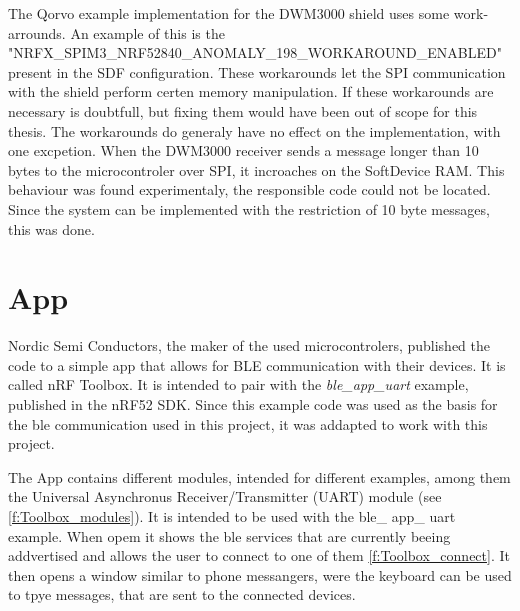 The Qorvo example implementation for the DWM3000 shield uses some work-arrounds. An example of this is the "NRFX{\_}SPIM3{\_}NRF52840{\_}ANOMALY{\_}198{\_}WORKAROUND{\_}ENABLED" present in the SDF configuration. These workarounds let the SPI communication with the shield perform certen memory manipulation. If these workarounds are necessary is doubtfull, but fixing them would have been out of scope for this thesis.
The workarounds do generaly have no effect on the implementation, with one excpetion. When the DWM3000 receiver sends a message longer than 10 bytes to the microcontroler over SPI, it incroaches on the SoftDevice RAM. This behaviour was found experimentaly, the responsible code could not be located. Since the system can be implemented with the restriction of 10 byte messages, this was done.



\section{App}
\label{s:app}
Nordic Semi Conductors, the maker of the used microcontrolers, published the code to a simple app that allows for BLE communication with their devices.
It is called nRF Toolbox.
It is intended to pair with the \textit{ble{\_}app{\_}uart} example, published in the nRF52 SDK.
Since this example code was used as the basis for the ble communication used in this project, it was addapted to work with this project.


The App contains different modules, intended for different examples, among them the Universal Asynchronus Receiver/Transmitter (UART) module (see \ref{f:Toolbox_modules}).
It is intended to be used with the ble\_ app\_ uart example.
When opem it shows the ble services that are currently beeing addvertised and allows the user to connect to one of them \ref{f:Toolbox_connect}.
It then opens a window similar to phone messangers, were the keyboard can be used to tpye messages, that are sent to the connected devices.

